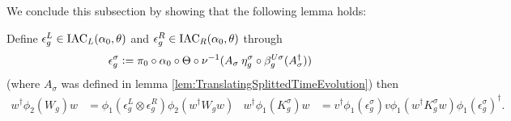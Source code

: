 \documentclass[11pt,a4paper,twoside]{article}
\numberwithin{equation}{section}
\begin{document}
	We conclude this subsection by showing that the following lemma holds:
	\begin{lemma}\label{lem:DefinitionOfEpsilons}
		Define $\epsilon^L_g\in\textrm{IAC}_L(\alpha_0,\theta)$ and $\epsilon^R_g\in\textrm{IAC}_R(\alpha_0,\theta)$ through
		\begin{align}
			\epsilon_g^\sigma\vcentcolon= \pi_0\circ\alpha_0\circ\Theta\circ\nu^{-1}(A_\sigma\:\eta_g^\sigma\circ\beta_{g}^{U\sigma}(A_\sigma^\dagger))
		\end{align}
		(where $A_\sigma$ was defined in lemma \ref{lem:TranslatingSplittedTimeEvolution}) then
		\begin{align}
			\label{eq:TransformationOfKUnderEpsilon}
			w^\dagger \phi_2(W_g)w &= \phi_1(\epsilon_g^L\otimes\epsilon_g^R)\phi_2(w^\dagger W_g w)&
			w^\dagger \phi_1(K_g^\sigma)w&=v^\dagger\phi_1(\epsilon_g^\sigma)v\phi_1(w^\dagger K_g^\sigma w)\phi_1(\epsilon_g^\sigma)^\dagger.
		\end{align}
	\end{lemma}
\end{document}
